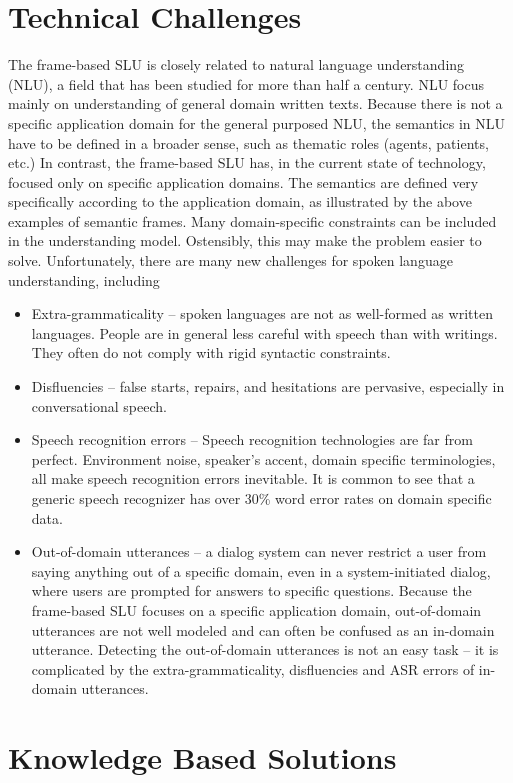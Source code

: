 \section{Technical Challenges}
The frame-based SLU is closely related to natural language understanding (NLU), a field
that has been studied for more than half a century. NLU focus mainly on understanding
of general domain written texts. Because there is not a specific application domain for the
general purposed NLU, the semantics in NLU have to be defined in a broader sense, such
as thematic roles (agents, patients, etc.) In contrast, the frame-based SLU has, in the current
state of technology, focused only on specific application domains. The semantics are defined
very specifically according to the application domain, as illustrated by the above examples
of semantic frames. Many domain-specific constraints can be included in the understanding
model. Ostensibly, this may make the problem easier to solve. Unfortunately, there are many
new challenges for spoken language understanding, including
\begin{itemize}
\item Extra-grammaticality – spoken languages are not as well-formed as written
languages. People are in general less careful with speech than with writings. They
often do not comply with rigid syntactic constraints.
\item Disfluencies – false starts, repairs, and hesitations are pervasive, especially in
conversational speech.
\item Speech recognition errors – Speech recognition technologies are far from perfect.
Environment noise, speaker’s accent, domain specific terminologies, all make speech
recognition errors inevitable. It is common to see that a generic speech recognizer has
over 30\% word error rates on domain specific data.
\item Out-of-domain utterances – a dialog system can never restrict a user from saying
anything out of a specific domain, even in a system-initiated dialog, where users are
prompted for answers to specific questions. Because the frame-based SLU focuses on
a specific application domain, out-of-domain utterances are not well modeled and can
often be confused as an in-domain utterance. Detecting the out-of-domain utterances is
not an easy task – it is complicated by the extra-grammaticality, disfluencies and ASR
errors of in-domain utterances.
\end{itemize}

\section{Knowledge Based Solutions}
